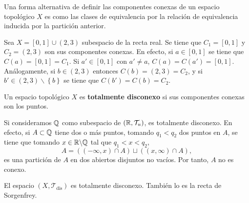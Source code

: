 \begin{observation}
Una forma alternativa de definir las componentes conexas de un espacio topológico $\displaystyle X $ es como las clases de equivalencia por la relación de equivalencia inducida por la partición anterior. 
\end{observation}
\begin{eg}
	Sea $\displaystyle X = \left[0,1\right] \cup \left(2,3\right) $ subespacio de la recta real. Se tiene que $\displaystyle C_{1}=\left[0,1\right]  $ y $\displaystyle C_{2} =\left(2,3\right)$ son sus componentes conexas. En efecto, si $\displaystyle a \in \left[0,1\right]  $ se tiene que $\displaystyle C\left(a\right)=\left[0,1\right] =C_{1} $. Si $\displaystyle a' \in\left[0,1\right]  $ con $\displaystyle a ' \neq a $, $\displaystyle C\left(a\right)=C\left(a'\right)=\left[0,1\right]  $. 
	Análogamente, si $\displaystyle b \in \left(2,3\right) $ entonces $\displaystyle C\left(b\right)=\left(2,3\right)=C_{2} $, y si $\displaystyle b'\in \left(2,3\right)\backslash \left\{ b\right\}  $ se tiene que $\displaystyle C\left(b'\right)=C\left(b\right)=C_{2} $.
\end{eg}
\begin{definition}
Un espacio topológico $\displaystyle X $ es \textbf{totalmente disconexo} si sus componentes conexas son los puntos.
\end{definition}
\begin{eg}
Si consideramos $\displaystyle \mathbb{Q} $ como subespacio de $\displaystyle \left(\mathbb{R}, \mathcal{T}_{u}\right) $, es totalmente disconexo. En efecto, si $\displaystyle A \subset \mathbb{Q} $ tiene dos o más puntos, tomando $\displaystyle q_{1}<q_{2} $ dos puntos en $\displaystyle A $, se tiene que tomando $\displaystyle x \in \mathbb{R} \backslash \mathbb{Q} $ tal que $\displaystyle q_{1} < x < q_{2} $,
\[A = \left(\left(-\infty, x\right)\cap A\right)\sqcup\left(\left(x, \infty\right)\cap A\right) ,\]
es una partición de $\displaystyle A $ en dos abiertos disjuntos no vacíos. Por tanto, $\displaystyle A $ no es conexo.	
\end{eg}
\begin{eg}
El espacio $\displaystyle \left(X, \mathcal{T}_{\text{dis}}\right) $ es totalmente disconexo. También lo es la recta de Sorgenfrey. 
\end{eg}
